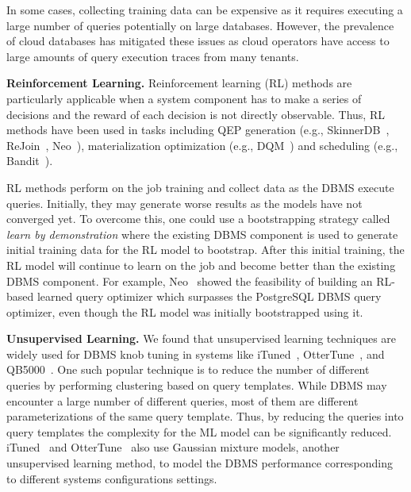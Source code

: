 In some cases, collecting training data can be expensive as it requires executing a large number of queries potentially on large databases.
However, the prevalence of cloud databases has mitigated these issues as cloud operators have access to large amounts of query execution traces from many tenants.

\vspace{2mm}
\noindent \textbf{Reinforcement Learning.} Reinforcement learning (RL) methods are particularly applicable when a system component has to make a series of decisions and the reward of each decision is not directly observable.
Thus, RL methods have been used in tasks including QEP generation (e.g., SkinnerDB~\cite{skinnerdb}, ReJoin~\cite{rejoin}, Neo~\cite{neo}), materialization optimization (e.g., DQM~\cite{dqm}) and scheduling (e.g., Bandit~\cite{bandit}).

RL methods perform on the job training and collect data as the DBMS execute queries.
Initially, they may generate worse results as the models have not converged yet.
To overcome this, one could use a bootstrapping strategy called  \textit{learn by demonstration} where the existing DBMS component is used to generate initial training data for the RL model to bootstrap.
After this initial training, the RL model will continue to learn on the job and become better than the existing DBMS component.
For example, Neo~\cite{neo} showed the feasibility of building an RL-based learned query optimizer which surpasses the PostgreSQL DBMS query optimizer, even though the RL model was initially bootstrapped using it.


\vspace{2mm}
\noindent \textbf{Unsupervised Learning.} We found that unsupervised learning techniques are widely used for DBMS knob tuning in systems like iTuned~\cite{ituned}, OtterTune~\cite{ottertune}, and QB5000~\cite{qb5000}.
One such popular technique is to reduce the number of different queries by performing clustering based on query templates.
While DBMS may encounter a large number of different queries, most of them are different parameterizations of the same query template.
Thus, by reducing the queries into query templates the complexity for the ML model can be significantly reduced.
iTuned~\cite{ituned} and OtterTune~\cite{ottertune} also use Gaussian mixture models, another unsupervised learning method, to model the DBMS performance corresponding to different systems configurations settings.